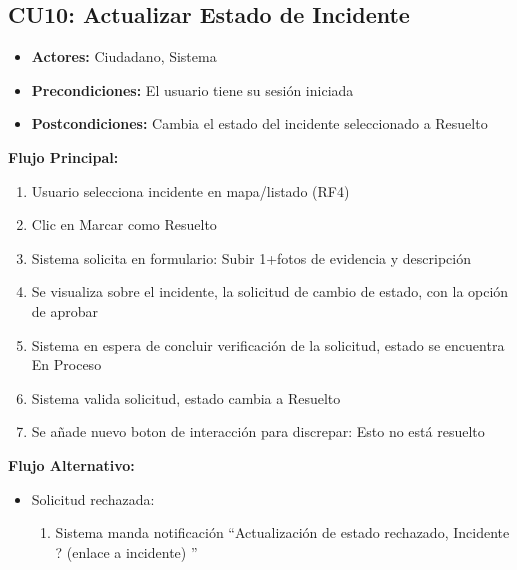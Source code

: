 \begin{multicols}{2}
\subsection*{CU10: Actualizar Estado de Incidente}
\begin{itemize}
    \item \textbf{Actores:} Ciudadano, Sistema
    \item \textbf{Precondiciones:} El usuario tiene su sesión iniciada
    \item \textbf{Postcondiciones:} Cambia el estado del incidente seleccionado a Resuelto
\end{itemize}
\textbf{Flujo Principal:}
\begin{enumerate}
    \item Usuario selecciona incidente en mapa/listado (RF4)
    \item Clic en Marcar como Resuelto
    \item Sistema solicita en formulario: Subir 1+fotos de evidencia y descripción
    \item Se visualiza sobre el incidente, la solicitud de cambio de estado, con la opción de aprobar
    \item Sistema en espera de concluir verificación de la solicitud, estado se encuentra En Proceso
    \item Sistema valida solicitud, estado cambia a Resuelto
    \item Se añade nuevo boton de interacción para discrepar: Esto no está resuelto
\end{enumerate}

\textbf{Flujo Alternativo:}
\begin{itemize}
    \item Solicitud rechazada:
    \begin{enumerate}
        \item Sistema manda notificación ``Actualización de estado rechazado, Incidente ? (enlace a incidente) ''
    \end{enumerate}
\end{itemize}


\end{multicols}
